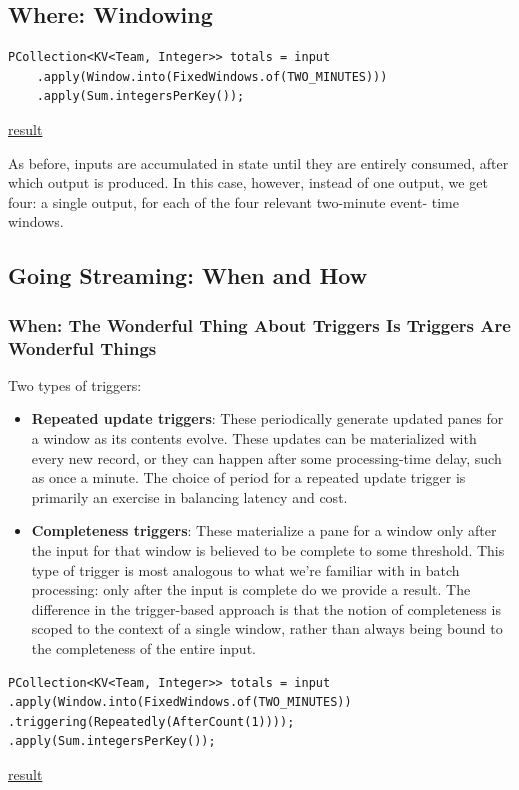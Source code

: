 \documentclass[11pt]{article}
\begin{document}
\subsection{Where: Windowing}
\label{sec:org5fe1c63}
\begin{verbatim}
PCollection<KV<Team, Integer>> totals = input
    .apply(Window.into(FixedWindows.of(TWO_MINUTES)))
    .apply(Sum.integersPerKey());
\end{verbatim}

\href{http://www.streamingbook.net/fig/2-5}{result}

As before, inputs are accumulated in state until they are entirely consumed,
after which output is produced. In this case, however, instead of one output,
we get four: a single output, for each of the four relevant two-minute event-
time windows.
\subsection{Going Streaming: When and How}
\label{sec:orge6ce209}
\subsubsection{When: The Wonderful Thing About Triggers Is Triggers Are Wonderful Things}
\label{sec:org4112ddd}
Two types of triggers:
\begin{itemize}
\item \textbf{Repeated update triggers}: These periodically generate updated panes for a window as its
contents evolve. These updates can be materialized with every new record, or they can happen
after some processing-time delay, such as once a minute. The choice of period for a repeated
update trigger is primarily an exercise in balancing latency and cost.
\item \textbf{Completeness triggers}: These materialize a pane for a window only after the input for that
window is believed to be complete to some threshold. This type of trigger is most analogous to
what we’re familiar with in batch processing: only after the input is complete do we provide a
result. The difference in the trigger-based approach is that the notion of completeness is
scoped to the context of a single window, rather than always being bound to the completeness
of the entire input.
\end{itemize}
\begin{verbatim}
PCollection<KV<Team, Integer>> totals = input
.apply(Window.into(FixedWindows.of(TWO_MINUTES))
.triggering(Repeatedly(AfterCount(1))));
.apply(Sum.integersPerKey());
\end{verbatim}
\href{http://www.streamingbook.net/fig/2-6}{result}
\end{document}
